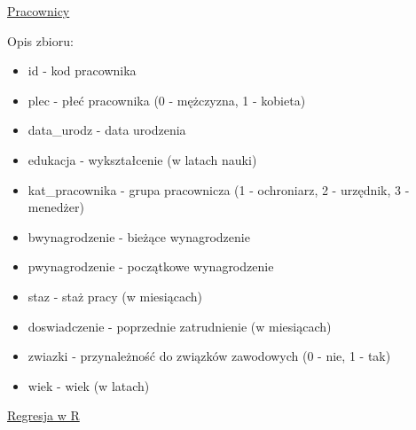 \documentclass[]{book}
\providecommand{\tightlist}{%
  \setlength{\itemsep}{0pt}\setlength{\parskip}{0pt}}
\begin{document}
\href{data/pracownicy.xlsx}{Pracownicy}

Opis zbioru:

\begin{itemize}
\tightlist
\item
  id - kod pracownika
\item
  plec - płeć pracownika (0 - mężczyzna, 1 - kobieta)
\item
  data\_urodz - data urodzenia
\item
  edukacja - wykształcenie (w latach nauki)
\item
  kat\_pracownika - grupa pracownicza (1 - ochroniarz, 2 - urzędnik, 3 - menedżer)
\item
  bwynagrodzenie - bieżące wynagrodzenie
\item
  pwynagrodzenie - początkowe wynagrodzenie
\item
  staz - staż pracy (w miesiącach)
\item
  doswiadczenie - poprzednie zatrudnienie (w miesiącach)
\item
  zwiazki - przynależność do związków zawodowych (0 - nie, 1 - tak)
\item
  wiek - wiek (w latach)
\end{itemize}

\href{res/regresja20190126.R}{Regresja w R}
\end{document}

